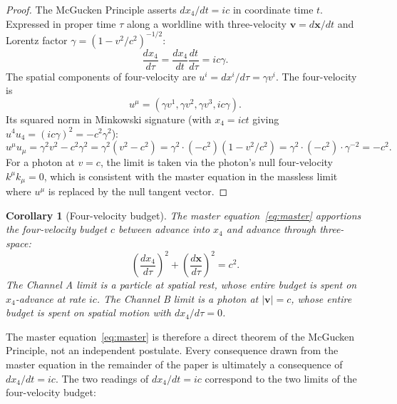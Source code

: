 \documentclass[11pt,a4paper]{article}
\newtheorem{corollary}{Corollary}
\begin{document}
\begin{proof}
The McGucken Principle asserts $dx_4/dt = ic$ in coordinate time $t$. Expressed in proper time $\tau$ along a worldline with three-velocity $\mathbf{v} = d\mathbf{x}/dt$ and Lorentz factor $\gamma = (1 - v^2/c^2)^{-1/2}$:
\begin{equation}
\frac{dx_4}{d\tau} = \frac{dx_4}{dt}\frac{dt}{d\tau} = ic\gamma.
\end{equation}
The spatial components of four-velocity are $u^i = dx^i/d\tau = \gamma v^i$. The four-velocity is
\begin{equation}
u^\mu = (\gamma v^1, \gamma v^2, \gamma v^3, ic\gamma).
\end{equation}
Its squared norm in Minkowski signature (with $x_4 = ict$ giving $u^4 u_4 = (ic\gamma)^2 = -c^2\gamma^2$):
\begin{equation}
u^\mu u_\mu = \gamma^2 v^2 - c^2\gamma^2 = \gamma^2 (v^2 - c^2) = \gamma^2 \cdot (-c^2)(1 - v^2/c^2) = \gamma^2 \cdot (-c^2) \cdot \gamma^{-2} = -c^2.
\end{equation}
For a photon at $v = c$, the limit is taken via the photon's null four-velocity $k^\mu k_\mu = 0$, which is consistent with the master equation in the massless limit where $u^\mu$ is replaced by the null tangent vector.
\end{proof}

\begin{corollary}[Four-velocity budget]
\label{cor:budget}
The master equation~\eqref{eq:master} apportions the four-velocity budget $c$ between advance into $x_4$ and advance through three-space:
\begin{equation}
\left(\frac{dx_4}{d\tau}\right)^2 + \left(\frac{d\mathbf{x}}{d\tau}\right)^2 = c^2.
\label{eq:budget}
\end{equation}
The Channel A limit is a particle at spatial rest, whose entire budget is spent on $x_4$-advance at rate $ic$. The Channel B limit is a photon at $|\mathbf{v}| = c$, whose entire budget is spent on spatial motion with $dx_4/d\tau = 0$.
\end{corollary}

The master equation~\eqref{eq:master} is therefore a direct theorem of the McGucken Principle, not an independent postulate. Every consequence drawn from the master equation in the remainder of the paper is ultimately a consequence of $dx_4/dt = ic$. The two readings of $dx_4/dt = ic$ correspond to the two limits of the four-velocity budget:
\end{document}
